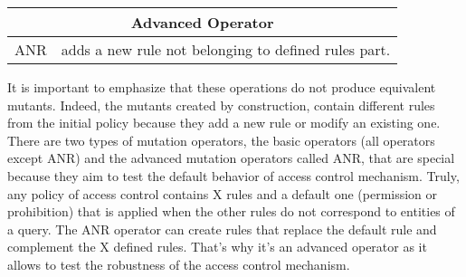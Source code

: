 \documentclass{acm_proc_article-sp}
\begin{document}
\begin{center}
\begin{tabular}{|p{1cm}|p{7cm}|}
  \hline
  \multicolumn{2}{|c|}{Advanced Operator} \\ \hline
  ANR & adds a new rule not belonging to defined rules part.\\ \hline
\end{tabular}
\end{center}
It is important to emphasize that these operations do not produce equivalent mutants. Indeed, the mutants created by construction, contain different rules  from the initial policy because they add a new rule or modify an existing one.\\
There are two types of mutation operators, the basic operators (all operators except ANR) and the advanced mutation operators called ANR, that are special because they aim to test the default behavior of access control mechanism. Truly, any policy of access control contains X rules and a default one (permission or prohibition) that is applied when the other rules do not correspond to entities of a query. The ANR operator can create rules that replace the default rule and complement the X defined rules. That's why it's an advanced operator as it allows to test the robustness of the access control mechanism.
\end{document}

